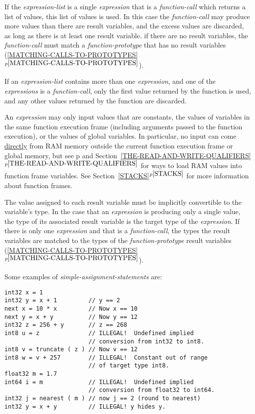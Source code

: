 \documentclass[12pt]{article}
\newcommand{\itemref}[1]{\ref{#1}$^{p\pageref{#1}}$}
\newcommand{\pagref}[1]{p\pageref{#1}}
\newenvironment{indpar}[1][0.3in]%
	{\begin{list}{}%
		     {\setlength{\itemsep}{0in}%
		      \setlength{\topsep}{0in}%
		      \setlength{\parsep}{1ex}%
		      \setlength{\labelwidth}{#1}%
		      \setlength{\leftmargin}{#1}%
		      \addtolength{\leftmargin}{\labelsep}}%
	 \item}%
	{\end{list}}
\begin{document}
If the {\em expression-list} is a single {\em expression} that
is a {\em function-call} which
returns a list of values, this list of values is used.
In this case the {\em function-call} may produce more values than
there are result variables, and the excess values are discarded,
as long as there is at least one result variable.
if there are no result variables, the
{\em function-call} must match a {\em function-prototype} that has
no result variables (\itemref{MATCHING-CALLS-TO-PROTOTYPES}).

If an {\em expression-list} contains more than one {\em expression},
and one of the {\em expressions} is a {\em function-call}, only the
first value returned by the function is used, and any other values
returned by the function are discarded.

An {\em expression} may only input values that are constants,
the values of variables in the same function execution
frame (including arguments passed to the function execution), 
or the values of global variables.  In particular,
no input can come \underline{directly}
from RAM memory outside the current function execution frame or
global memory,
but see \pagref{READ} and Section~\itemref{THE-READ-AND-WRITE-QUALIFIERS}
for ways to load RAM values into function frame variables.
See Section~\itemref{STACKS} for more information about
function frames.

The value assigned to each result variable must be implicitly convertible to
the variable's type.
In the case that an {\em expression} is producing
only a single value, the type of its associated result variable is the target
type of the {\em expression}.  If there is only one {\em expression}
and that is a {\em function-call}, the types the result variables
are matched to the types of the {\em function-prototype} result
variables (\itemref{MATCHING-CALLS-TO-PROTOTYPES}).

Some examples of {\em simple-assignment-statements} are:
\begin{indpar}\begin{verbatim}
int32 x = 1
int32 y = x + 1         // y == 2
next x = 10 * x         // Now x == 10
next y = x + y          // Now y == 12
int32 z = 256 + y       // z == 268
int8 u = z              // ILLEGAL!  Undefined implied
                        // conversion from int32 to int8.
int8 v = truncate ( z ) // Now v == 12
int8 w = v + 257        // ILLEGAL!  Constant out of range
                        // of target type int8.
float32 m = 1.7
int64 i = m             // ILLEGAL!  Undefined implied
                        // conversion from float32 to int64.
int32 j = nearest ( m ) // now j == 2 (round to nearest)
int32 y = x + y         // ILLEGAL! y hides y.
\end{verbatim}\end{indpar}
\end{document}
